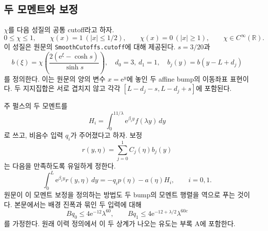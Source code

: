 \documentclass[11pt,a4paper]{article}
\theoremstyle{definition}
\theoremstyle{remark}\newtheorem{remark}[theorem]{주의}
\newcommand{\R}{\mathbb R}
\newcommand{\e}{\mathrm e}
\begin{document}
\subsection{두 모멘트와 보정}
$\chi$를 다음 성질의 공통 cutoff라고 하자.
\begin{equation}\label{chi}
0\le\chi\le1,\qquad \chi(x)=1\ (|x|\le1/2),\qquad
\chi(x)=0\ (|x|\ge1),\qquad \chi\in C^\infty(\R).
\end{equation}
이 성질은 원문의 \texttt{SmoothCutoffs.cutoff}에 대해 제공된다\cite{repair,mathlib}. $s=3/20$과
\begin{equation}\label{bump}
b(\xi)=\chi\left(\frac{2(\e^\xi-\cosh s)}{\sinh s}\right),\quad
 d_0=3,\ d_1=1,\quad b_j(y)=b(y-L+d_j)
\end{equation}
를 정의한다. 이는 원문의 양의 변수 $x=\e^y$에 놓인 두 affine bump의 이동좌표 표현이다. 두 지지집합은 서로 겹치지 않고 각각
$[L-d_j-s,L-d_j+s]$에 포함된다.

주 펄스의 두 모멘트를
\begin{equation}\label{moments}
 H_i=\int_0^{11/\lambda}\e^{\beta_i y}f(\lambda y)\,dy
\end{equation}
로 쓰고, 비음수 입력 $q_i$가 주어졌다고 하자. 보정
\begin{equation}\label{repairdef}
 r(y,\eta)=\sum_{j=0}^1 C_j(\eta)b_j(y)
\end{equation}
는 다음을 만족하도록 유일하게 정한다.
\begin{equation}\label{debt}
\int_0^L\e^{\beta_i y}r(y,\eta)\,dy
=-q_i p(\eta)-a(\eta)H_i,\qquad i=0,1.
\end{equation}
원문이 이 모멘트 보정을 정의하는 방법도 두 bump의 모멘트 행렬을 역으로 푸는 것이다\cite{repair}. 본문에서는 배경 진폭과 묶인 두 입력에 대해
\begin{equation}\label{prefixassumption}
 Bq_0\le4\e^{-12}\lambda^{60},\qquad
 Bq_1\le4\e^{-12+\lambda/2}\lambda^{60c}
\end{equation}
를 가정한다. 원래 이력 정의에서 이 두 상계가 나오는 유도는 부록 A에 포함한다.
\end{document}
